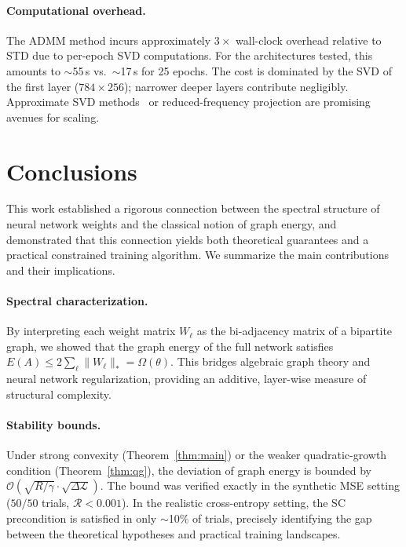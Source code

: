 \documentclass[a4paper,fleqn]{cas-sc}
\theoremstyle{remark}
\theoremstyle{definition}
\begin{document}
\paragraph{Computational overhead.}
The ADMM method incurs approximately $3\times$ wall-clock overhead relative to STD due to per-epoch SVD computations. For the architectures tested, this amounts to $\sim$55\,s vs.\ $\sim$17\,s for 25 epochs. The cost is dominated by the SVD of the first layer ($784\times 256$); narrower deeper layers contribute negligibly. Approximate SVD methods~\cite{Cai2010SVT} or reduced-frequency projection are promising avenues for scaling.


\section{Conclusions}\label{sec:conclusions}

This work established a rigorous connection between the spectral structure of neural network weights and the classical notion of graph energy, and demonstrated that this connection yields both theoretical guarantees and a practical constrained training algorithm. We summarize the main contributions and their implications.

\paragraph{Spectral characterization.}
By interpreting each weight matrix $W_\ell$ as the bi-adjacency matrix of a bipartite graph, we showed that the graph energy of the full network satisfies $E(A)\le 2\sum_\ell\|W_\ell\|_*=\Omega(\theta)$. This bridges algebraic graph theory and neural network regularization, providing an additive, layer-wise measure of structural complexity.

\paragraph{Stability bounds.}
Under strong convexity (Theorem~\ref{thm:main}) or the weaker quadratic-growth condition (Theorem~\ref{thm:qg}), the deviation of graph energy is bounded by $\mathcal{O}(\sqrt{R/\gamma}\cdot\sqrt{\Delta\mathcal{L}})$. The bound was verified exactly in the synthetic MSE setting ($50/50$ trials, $\mathcal{R}<0.001$). In the realistic cross-entropy setting, the SC precondition is satisfied in only $\sim$10\% of trials, precisely identifying the gap between the theoretical hypotheses and practical training landscapes.
\end{document}
